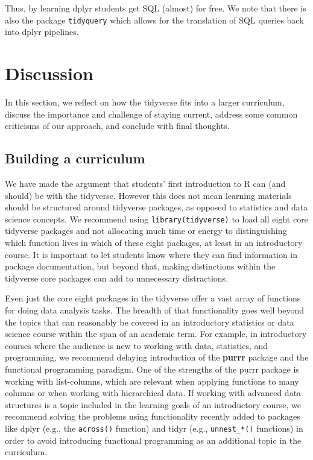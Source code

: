 \documentclass[12pt]{article}
\begin{document}

\label{show-query} \linespread{2}
\vspace{3mm}\setlength{\parindent}{15pt}

Thus, by learning dplyr students get SQL (almost) for free. We note that
there is also the package \texttt{tidyquery} \citep{R-tidyquery} which
allows for the translation of SQL queries back into dplyr pipelines.

\hypertarget{sec:discussion}{%
\section{Discussion}\label{sec:discussion}}

In this section, we reflect on how the tidyverse fits into a larger
curriculum, discuss the importance and challenge of staying current,
address some common criticisms of our approach, and conclude with final
thoughts.

\hypertarget{building-a-curriculum}{%
\subsection{Building a curriculum}\label{building-a-curriculum}}

We have made the argument that students' first introduction to R can
(and should) be with the tidyverse. However this does not mean learning
materials should be structured around tidyverse packages, as opposed to
statistics and data science concepts. We recommend using
\texttt{library(tidyverse)} to load all eight core tidyverse packages
and not allocating much time or energy to distinguishing which function
lives in which of these eight packages, at least in an introductory
course. It is important to let students know where they can find
information in package documentation, but beyond that, making
distinctions within the tidyverse core packages can add to unnecessary
distractions.

Even just the core eight packages in the tidyverse offer a vast array of
functions for doing data analysis tasks. The breadth of that
functionality goes well beyond the topics that can reasonably be covered
in an introductory statistics or data science course within the span of
an academic term. For example, in introductory courses where the
audience is new to working with data, statistics, and programming, we
recommend delaying introduction of the \textbf{purrr} package
\citep{R-purrr} and the functional programming paradigm. One of the
strengths of the purrr package is working with list-columns, which are
relevant when applying functions to many columns or when working with
hierarchical data. If working with advanced data structures is a topic
included in the learning goals of an introductory course, we recommend
solving the problems using functionality recently added to packages like
dplyr (e.g., the \texttt{across()} function) and tidyr (e.g.,
\texttt{unnest\_*()} functions) in order to avoid introducing functional
programming as an additional topic in the curriculum.
\end{document}
